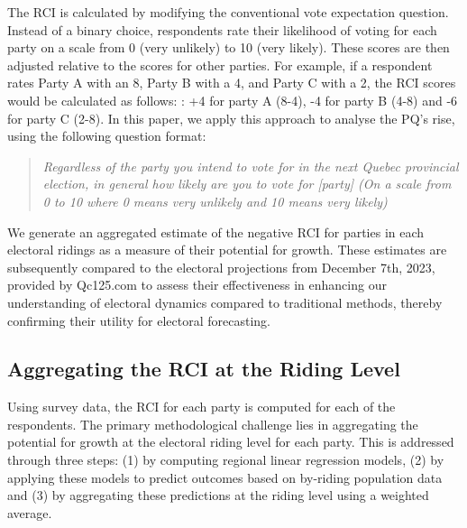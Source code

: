 \documentclass[
  journal=medium,
  manuscript=article-type,
  year=2024
]{cup-journal}
\begin{document}
The RCI is calculated by modifying the conventional vote expectation question. Instead of a binary choice, respondents rate their likelihood of voting for each party on a scale from 0 (very unlikely) to 10 (very likely). These scores are then adjusted relative to the scores for other parties. For example, if a respondent rates Party A with an 8, Party B with a 4, and Party C with a 2, the RCI scores would be calculated as follows: : +4 for party A (8-4), -4 for party B (4-8) and -6 for party C (2-8). In this paper, we apply this approach to analyse the PQ's rise, using the following question format:

\begin{quote}
    \textit{Regardless of the party you intend to vote for in the next Quebec provincial election, in general how likely are you to vote for [party] (On a scale from 0 to 10 where 0 means very unlikely and 10 means very likely)}
\end{quote}

We generate an aggregated estimate of the negative RCI for parties in each electoral ridings as a measure of their potential for growth. These estimates are subsequently compared to the electoral projections from  December 7th, 2023, provided by Qc125.com \autocite{Qc12523} to assess their effectiveness in enhancing our understanding of electoral dynamics compared to traditional methods, thereby confirming their utility for electoral forecasting.

\subsection{Aggregating the RCI at the Riding Level}

Using survey data, the RCI for each party is computed for each of the respondents. The primary methodological challenge lies in aggregating the potential for growth at the electoral riding level for each party. This is addressed through three steps: (1) by computing regional linear regression models, (2) by applying these models to predict outcomes based on by-riding population data and (3) by aggregating these predictions at the riding level using a weighted average.

\end{document}
